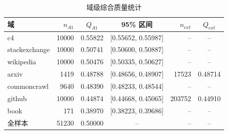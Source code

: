 \begin{table}[!htbp]
  \centering
  \caption{域级综合质量统计}
  \label{tab:q1_domain_Q}
  \songti{}
  \begin{tabular}{lrccrc}
    \toprule
    域 & $n_{A1}$ & $Q_{A1}$ & 95\% 区间 & $n_{ext}$ & $Q_{ext}$ \\
    \midrule
    c4 & 10000 & 0.55822 & [0.55652, 0.55987] & -- & -- \\
    stackexchange & 10000 & 0.50741 & [0.50600, 0.50887] & -- & -- \\
    wikipedia & 10000 & 0.50476 & [0.50335, 0.50627] & -- & -- \\
    arxiv & 1419 & 0.48788 & [0.48656, 0.48907] & 17523 & 0.48714 \\
    commoncrawl & 9640 & 0.48390 & [0.48233, 0.48544] & -- & -- \\
    github & 10000 & 0.44874 & [0.44668, 0.45065] & 203752 & 0.44910 \\
    book & 171 & 0.38970 & [0.38223, 0.39686] & -- & -- \\
    \midrule
    全样本 & 51230 & 0.50000 & -- & -- & -- \\
    \bottomrule
  \end{tabular}
\end{table}
